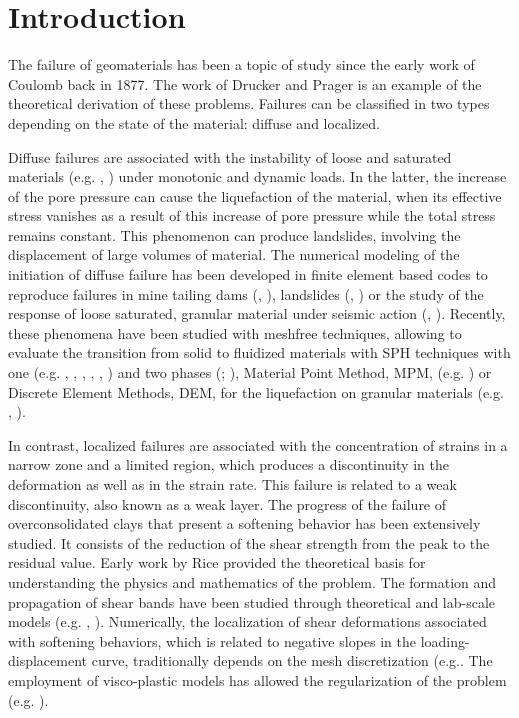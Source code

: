 \documentclass[applsci,journal,article,submit,moreauthors,pdftex]{Definitions/mdpi}
\begin{document}
\section{Introduction}
The failure of geomaterials has been a topic of study since the early work of Coulomb back in 1877. The work of Drucker and Prager \cite{Drucker-Prager} is an example of the theoretical derivation of these problems. Failures can be classified in two types depending on the state of the material: diffuse and localized.

Diffuse failures are associated with the instability of loose and saturated materials (e.g. \cite{DarveLaouafa2000}, \cite{Pastor2009b}) under monotonic and dynamic loads. In the latter, the increase of the pore pressure can cause the liquefaction of the material, when its effective stress vanishes as a result of this increase of pore pressure while the total stress remains constant. This phenomenon can produce landslides, involving the displacement of large volumes of material. The numerical modeling of the initiation of diffuse failure has been developed in finite element based codes to reproduce failures in mine tailing dams (\cite{Ledesma2021}, \cite{Ledesma2022}), landslides (\cite{Laouafa2002}, \cite{FernandezMerodo2004}) or the study of the response of loose saturated, granular material under seismic action (\cite{LopezQuerolB2006}, \cite{Manzanal2021}). Recently, these phenomena have been studied with meshfree techniques, allowing to evaluate the transition from solid to fluidized materials with SPH techniques with one (e.g. \cite{Pastor2009b}, \cite{Manzanal2016}, \cite{Dutto2017}, \cite{Longo2019}, \cite{Lin2019}, \cite{ZHANG20201107}) and two phases (\cite{Pastor2017}; \cite{Pastor2021}), Material Point Method, MPM, (e.g. \cite{Zaba2011,Yerro:2015,Yerro:2016,CUOMO2021}) or Discrete Element Methods, DEM, for the liquefaction on granular materials (e.g. \cite{Feng2021}, \cite{SIZKOW2021}).

In contrast, localized failures are associated with the concentration of strains in a narrow zone and a limited region, which produces a discontinuity in the deformation as well as in the strain rate. This failure is related to a weak discontinuity, also known as a weak layer. The progress of the failure of overconsolidated clays that present a softening behavior has been extensively studied. It consists of the reduction of the shear strength from the peak to the residual value. Early work by Rice \cite{Rice1973} provided the theoretical basis for understanding the physics and mathematics of the problem. The formation and propagation of shear bands have been studied through theoretical and lab-scale models (e.g. \cite{Desrues_1984}, \cite{Sulem1995}). Numerically, the localization of shear deformations associated with softening behaviors, which is related to negative slopes in the loading-displacement curve, traditionally depends on the mesh discretization (e.g.\cite{Wang:1997}. The employment of visco-plastic models has allowed the regularization of the problem (e.g. \cite{GutierreDeBort}).
\end{document}
